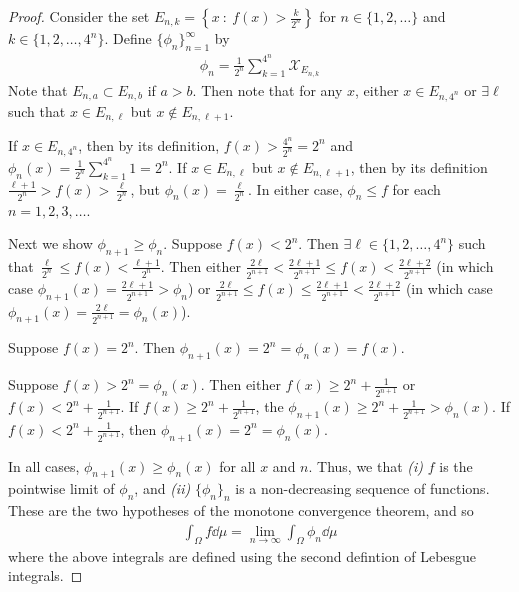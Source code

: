 \documentclass[12pt]{article}
\theoremstyle{plain}
\begin{document}
\begin{proof}
    Consider the set $E_{n,k} = \left\{x\ :\ f(x) > \frac{k}{2^n}\right\}$ for $n \in \{1, 2, \dots\}$ and $k \in \{1, 2, \dots, 4^n\}$.  Define $\{\phi_n\}_{n=1}^\infty$ by
    \begin{align*}
        \phi_n = \frac{1}{2^n}\sum_{k=1}^{4^n}\mathcal{X}_{E_{n,k}}
    \end{align*}
    Note that $E_{n,a} \subset E_{n,b}$ if $a > b$.  Then note that for any $x$, either $x \in E_{n, 4^n}$ or $\exists\ell$ such that $x \in E_{n, \ell}$ but $x \not\in E_{n, \ell+1}$.

    If $x \in E_{n, 4^n}$, then by its definition, $f(x) > \frac{4^n}{2^n} = 2^n$ and $\phi_n(x) = \frac{1}{2^n}\sum_{k=1}^{4^n} 1 = 2^n$.  If $x \in E_{n,\ell}$ but $x \not \in E_{n,\ell+1}$, then by its definition $\frac{\ell + 1}{2^n} > f(x) > \frac{\ell}{2^n}$, but $\phi_n(x) = \frac{\ell}{2^n}$.  In either case, $\phi_n \leq f$ for each $n = 1, 2, 3, \dots$.

    Next we show $\phi_{n+1} \geq \phi_n$.  Suppose $f(x) < 2^n$.  Then $\exists \ell \in \{1, 2, \dots, 4^n\}$ such that $\frac{\ell}{2^n} \leq f(x) < \frac{\ell + 1}{2^n}$.  Then either $\frac{2\ell}{2^{n+1}} < \frac{2\ell + 1}{2^{n+1}} \leq f(x) < \frac{2\ell + 2}{2^{n+1}}$ (in which case $\phi_{n+1}(x) = \frac{2\ell + 1}{2^{n+1}} > \phi_n$) or $\frac{2\ell}{2^{n+1}} \leq f(x) \leq \frac{2\ell + 1}{2^{n+1}} < \frac{2\ell + 2}{2^{n+1}}$ (in which case $\phi_{n+1}(x) = \frac{2\ell}{2^{n+1}} = \phi_n(x)$).

    Suppose $f(x) = 2^n$.  Then $\phi_{n+1}(x) = 2^n = \phi_n(x) = f(x)$.

    Suppose $f(x) > 2^n = \phi_n(x)$.  Then either $f(x) \geq 2^n + \frac{1}{2^{n+1}}$ or $f(x) < 2^n + \frac{1}{2^{n+1}}$.  If $f(x) \geq 2^n + \frac{1}{2^{n+1}}$, the $\phi_{n+1}(x) \geq 2^n + \frac{1}{2^{n+1}} > \phi_n(x)$.  If $f(x) < 2^n + \frac{1}{2^{n+1}}$, then $\phi_{n+1}(x) = 2^n = \phi_n(x)$.

    In all cases, $\phi_{n+1}(x) \geq \phi_n(x)$ for all $x$ and $n$.  Thus, we that \emph{(i)} $f$ is the pointwise limit of $\phi_n$, and \emph{(ii)} $\{\phi_n\}_n$ is a non-decreasing sequence of functions.  These are the two hypotheses of the monotone convergence theorem, and so
    \begin{align*}
        \int_\Omega f \dd \mu = \lim_{n\rightarrow \infty} \int_\Omega \phi_n \dd \mu
    \end{align*}
    where the above integrals are defined using the second defintion of Lebesgue integrals.


\end{proof}
\end{document}
